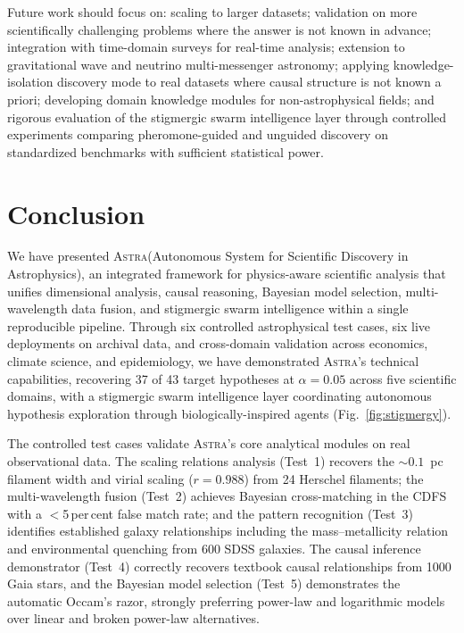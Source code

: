 \documentclass[usenatbib]{rasti}
\newcommand{\astra}{\textsc{Astra}\xspace}
\begin{document}
Future work should focus on: scaling to larger datasets; validation on more scientifically challenging problems where the answer is not known in advance; integration with time-domain surveys for real-time analysis; extension to gravitational wave and neutrino multi-messenger astronomy; applying knowledge-isolation discovery mode to real datasets where causal structure is not known a priori; developing domain knowledge modules for non-astrophysical fields; and rigorous evaluation of the stigmergic swarm intelligence layer through controlled experiments comparing pheromone-guided and unguided discovery on standardized benchmarks with sufficient statistical power.

\section{Conclusion}
\label{sec:conclusion}

We have presented \astra (Autonomous System for Scientific Discovery in Astrophysics), an integrated framework for physics-aware scientific analysis that unifies dimensional analysis, causal reasoning, Bayesian model selection, multi-wavelength data fusion, and stigmergic swarm intelligence within a single reproducible pipeline.
Through six controlled astrophysical test cases, six live deployments on archival data, and cross-domain validation across economics, climate science, and epidemiology, we have demonstrated \astra's technical capabilities, recovering 37 of 43 target hypotheses at $\alpha = 0.05$ across five scientific domains, with a stigmergic swarm intelligence layer coordinating autonomous hypothesis exploration through biologically-inspired agents (Fig.~\ref{fig:stigmergy}).

The controlled test cases validate \astra's core analytical modules on real observational data.
The scaling relations analysis (Test~1) recovers the ${\sim}0.1$~pc filament width and virial scaling ($r = 0.988$) from 24 Herschel filaments; the multi-wavelength fusion (Test~2) achieves Bayesian cross-matching in the CDFS with a $<$5\,per\,cent false match rate; and the pattern recognition (Test~3) identifies established galaxy relationships including the mass--metallicity relation and environmental quenching from 600 SDSS galaxies.
The causal inference demonstrator (Test~4) correctly recovers textbook causal relationships from 1000 Gaia stars, and the Bayesian model selection (Test~5) demonstrates the automatic Occam's razor, strongly preferring power-law and logarithmic models over linear and broken power-law alternatives.
\end{document}
